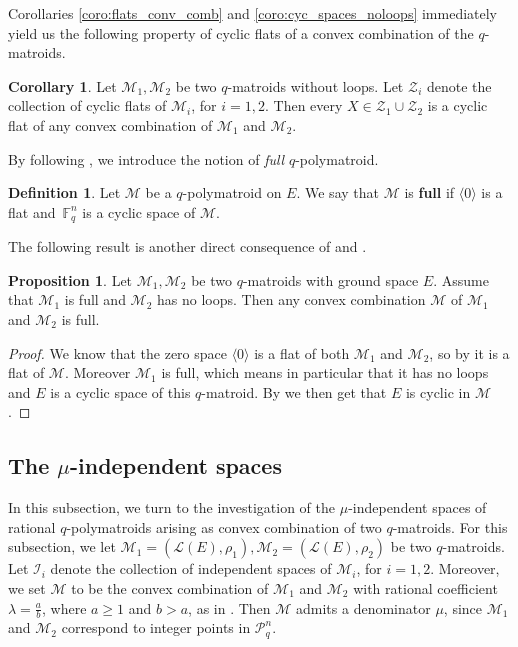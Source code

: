 \documentclass[a4paper,11pt,reqno]{amsart}
\theoremstyle{definition}
\newtheorem{definition}[theorem]{{{Definition}}}
\newtheorem{corollary}[theorem]{{{Corollary}}}%
\newtheorem{proposition}[theorem]{{{Proposition}}}
\newcommand{\mM}{\mathcal{M}}
\newcommand{\mL}{\mathcal{L}}
\newcommand{\mI}{\mathcal{I}}
\newcommand{\mZ}{\mathcal{Z}}
\newcommand{\F}{\mathbb F}
\newcommand{\RP}{\mathcal{P}_q^n}
\begin{document}
{Corollaries \ref{coro:flats_conv_comb} and \ref{coro:cyc_spaces_noloops} immediately yield us the following property of cyclic flats of a convex combination of the $q$-matroids.

\begin{corollary}
    Let $\mM_1, \mM_2$ be two $q$-matroids without loops. Let $\mZ_i$ denote the collection of cyclic flats of $\mM_i$, for $i=1,2$. Then every $X\in\mZ_1\cup\mZ_2$ is a cyclic flat of any convex combination of $\mM_1$ and $\mM_2$.
\end{corollary}

By following \cite[Def. 7.7]{gluesing2024decompositions}, we introduce the notion of \emph{full} $q$-polymatroid.

\begin{definition}
    Let $\mM$ be a $q$-polymatroid on $E$. We say that $\mM$ is \textbf{full} if $\langle 0\rangle$ is a flat and~$\F_q^n$ is a cyclic space of $\mM$.
\end{definition}

The following result is another direct consequence of  and .

\begin{proposition}
    Let $\mM_1,\mM_2$ be two $q$-matroids with ground space $E$. Assume that $\mM_1$ is full and $\mM_2$ has no loops. Then any convex combination $\mM$ of $\mM_1$ and $\mM_2$ is full. 
\end{proposition}
\begin{proof}
    We know that the zero space $\langle 0\rangle$ is a flat of both $\mM_1$ and $\mM_2$, so by  it is a flat of $\mM$. Moreover $\mM_1$ is full, which means in particular that it has no loops and $E$ is a cyclic space of this $q$-matroid. By  we then get that $E$ is cyclic in $\mM$.
\end{proof}


\subsection{The $\mu$-independent spaces}\label{subsec: mu_indeps}

In this subsection,  we turn to the investigation of the $\mu$-independent spaces of rational $q$-polymatroids arising as convex combination of two $q$-matroids. For this subsection, we let $\mM_1=(\mL(E),\rho_1), \mM_2=(\mL(E),\rho_2)$ be two $q$-matroids. Let $\mI_i$ denote the collection of independent spaces of $\mM_i$, for $i=1,2$. Moreover, we set $\mM$ to be the convex combination of $\mM_1$ and $\mM_2$ with rational coefficient $\lambda = \frac{a}{b}$, where $a\geq 1 $ and $b>a$, as in . Then $\mM$ admits a denominator $\mu$, since $\mM_1$ and $\mM_2$ correspond to integer points in $\RP$.




}
\end{document}
